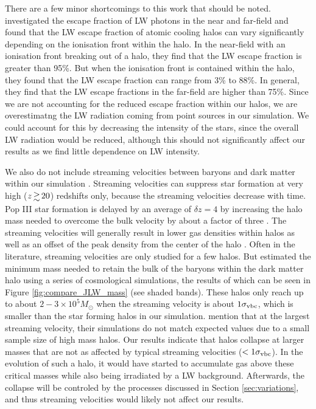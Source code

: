 \documentclass[fleqn,usenatbib]{mnras}
\begin{document}
There are a few minor shortcomings to this work that should be noted. \citet{Schauer17} investigated the escape fraction of LW photons in the near and far-field and found that the LW escape fraction of atomic cooling halos can vary significantly depending on the ionisation front within the halo. In the near-field with an ionisation front breaking out of a halo, they find that the LW escape fraction is greater than 95\%. But when the ionisation front is contained within the halo, they found that the LW escape fraction can range from 3\% to 88\%. In general, they find that the LW escape fractions in the far-field are higher than 75\%. Since we are not accounting for the reduced escape fraction within our halos, we are overestimatng the LW radiation coming from point sources in our simulation. We could account for this by decreasing the intensity of the stars, since the overall LW radiation would be reduced, although this should not significantly affect our results as we find little dependence on LW intensity. 

We also do not include streaming velocities between baryons and dark matter within our simulation \citep{Tselia11, Greif11_Delay, Naoz12, OLeary12}. Streaming velocities can suppress star formation at very high ($z \ga 20$) redshifts only, because the streaming velocities decrease with time. Pop III star formation is delayed by an average of $\delta z = 4$ by increasing the halo mass needed to overcome the bulk velocity by about a factor of three \citep{Greif11_Delay}. The streaming velocities will generally result in lower gas densities within halos as well as an offset of the peak density from the center of the halo \citep{OLeary12}. Often in the literature, streaming velocities are only studied for a few halos. But \citet{Naoz13} estimated the minimum mass needed to retain the bulk of the baryons within the dark matter halo using a series of cosmological simulations, the results of which can be seen in Figure \ref{fig:compare_JLW_mass} (see shaded bands). These halos only reach up to about $2 - 3 \times 10^5 M_\odot$ when the streaming velocity is about $1\sigma_{\rm vbc}$, which is smaller than the star forming halos in our simulation. \citet{Naoz13} mention that at the largest streaming velocity, their simulations do not match expected values due to a small sample size of high mass halos. Our results indicate that halos collapse at larger masses that are not as affected by typical streaming velocities ($<1\sigma_{\rm vbc}$).  In the evolution of such a halo, it would have started to accumulate gas above these critical masses while also being irradiated by a LW background.  Afterwards, the collapse will be controled by the processes discussed in Section \ref{sec:variations}, and thus streaming velocities would likely not affect our results.
\end{document}
